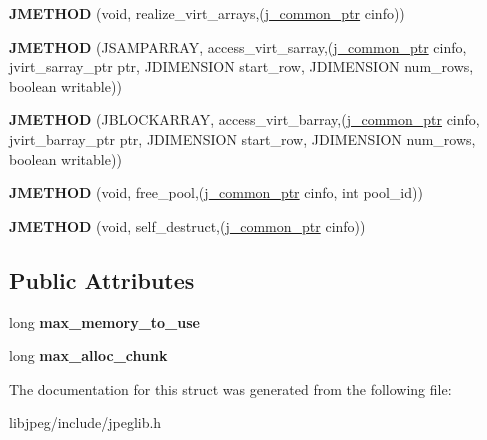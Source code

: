 \begin{DoxyCompactItemize}
\item 
\hypertarget{structjpeg__memory__mgr_a35cc0c3b3ecbc7209cdc23b2255932d8}{{\bfseries J\-M\-E\-T\-H\-O\-D} (void, realize\-\_\-virt\-\_\-arrays,(\hyperlink{structjpeg__common__struct}{j\-\_\-common\-\_\-ptr} cinfo))}\label{structjpeg__memory__mgr_a35cc0c3b3ecbc7209cdc23b2255932d8}

\item 
\hypertarget{structjpeg__memory__mgr_a747ad4316a4794b13f9fdff4f6f699ca}{{\bfseries J\-M\-E\-T\-H\-O\-D} (J\-S\-A\-M\-P\-A\-R\-R\-A\-Y, access\-\_\-virt\-\_\-sarray,(\hyperlink{structjpeg__common__struct}{j\-\_\-common\-\_\-ptr} cinfo, jvirt\-\_\-sarray\-\_\-ptr ptr, J\-D\-I\-M\-E\-N\-S\-I\-O\-N start\-\_\-row, J\-D\-I\-M\-E\-N\-S\-I\-O\-N num\-\_\-rows, boolean writable))}\label{structjpeg__memory__mgr_a747ad4316a4794b13f9fdff4f6f699ca}

\item 
\hypertarget{structjpeg__memory__mgr_aa460f4b500825e051306b8ce5583d052}{{\bfseries J\-M\-E\-T\-H\-O\-D} (J\-B\-L\-O\-C\-K\-A\-R\-R\-A\-Y, access\-\_\-virt\-\_\-barray,(\hyperlink{structjpeg__common__struct}{j\-\_\-common\-\_\-ptr} cinfo, jvirt\-\_\-barray\-\_\-ptr ptr, J\-D\-I\-M\-E\-N\-S\-I\-O\-N start\-\_\-row, J\-D\-I\-M\-E\-N\-S\-I\-O\-N num\-\_\-rows, boolean writable))}\label{structjpeg__memory__mgr_aa460f4b500825e051306b8ce5583d052}

\item 
\hypertarget{structjpeg__memory__mgr_a7e7e063767441999982d22c5cc0e9423}{{\bfseries J\-M\-E\-T\-H\-O\-D} (void, free\-\_\-pool,(\hyperlink{structjpeg__common__struct}{j\-\_\-common\-\_\-ptr} cinfo, int pool\-\_\-id))}\label{structjpeg__memory__mgr_a7e7e063767441999982d22c5cc0e9423}

\item 
\hypertarget{structjpeg__memory__mgr_ae80ddea0ba4f845f91d3a30e350b5f44}{{\bfseries J\-M\-E\-T\-H\-O\-D} (void, self\-\_\-destruct,(\hyperlink{structjpeg__common__struct}{j\-\_\-common\-\_\-ptr} cinfo))}\label{structjpeg__memory__mgr_ae80ddea0ba4f845f91d3a30e350b5f44}

\end{DoxyCompactItemize}
\subsection*{Public Attributes}
\begin{DoxyCompactItemize}
\item 
\hypertarget{structjpeg__memory__mgr_aa7ef7c0d7ffbfcbee837ae9cb8b12c7e}{long {\bfseries max\-\_\-memory\-\_\-to\-\_\-use}}\label{structjpeg__memory__mgr_aa7ef7c0d7ffbfcbee837ae9cb8b12c7e}

\item 
\hypertarget{structjpeg__memory__mgr_a0301712c8796bb5555093d72b37c5a58}{long {\bfseries max\-\_\-alloc\-\_\-chunk}}\label{structjpeg__memory__mgr_a0301712c8796bb5555093d72b37c5a58}

\end{DoxyCompactItemize}


The documentation for this struct was generated from the following file\-:\begin{DoxyCompactItemize}
\item 
libjpeg/include/jpeglib.\-h\end{DoxyCompactItemize}
